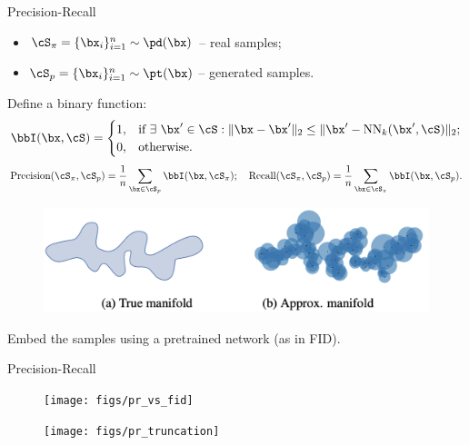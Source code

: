 \documentclass{beamer}
\begin{document}
\begin{frame}{Precision-Recall}
	\vspace{-0.2cm}
	\begin{itemize}
		\item $\cS_{\pi} = \{\bx_i\}_{i=1}^{n} \sim \pd(\bx)$ -- real samples;
		\item $\cS_{p} = \{\bx_i\}_{i=1}^{n} \sim \pt(\bx)$ -- generated samples.
	\end{itemize}
	\eqpause
	Define a binary function:
	\vspace{-0.2cm}
	\[
		\bbI(\bx, \cS) =
		\begin{cases}
			1, & \text{if } \exists\ \bx' \in \cS: \| \bx - \bx'\|_2 \leq \| \bx' - \text{NN}_k(\bx', \cS)\|_2; \\
			0, & \text{otherwise.}
		\end{cases}
	\]
	\eqpause
	\vspace{-0.3cm}
	\[
		\text{Precision} (\cS_{\pi}, \cS_{p}) = \frac{1}{n} \sum_{\bx \in \cS_{p}} \bbI(\bx, \cS_{\pi}); \quad \text{Recall} (\cS_{\pi}, \cS_{p}) = \frac{1}{n} \sum_{\bx \in \cS_{\pi}} \bbI(\bx, \cS_{p}).
	\]
	\eqpause
	\vspace{-0.6cm}
	\begin{figure}
		\includegraphics[width=0.75\linewidth]{figs/pr_k_nearest}
	\end{figure}
	\eqpause
	Embed the samples using a pretrained network (as in FID).
\end{frame}
\begin{frame}{Precision-Recall}
	\vspace{-0.3cm}
	\begin{figure}
		\texttt{[image: figs/pr\_vs\_fid]}
	\end{figure}
	\eqpause
	\vspace{-0.3cm}
	\begin{figure}
		\texttt{[image: figs/pr\_truncation]}
	\end{figure}
\end{frame}
\end{document}
